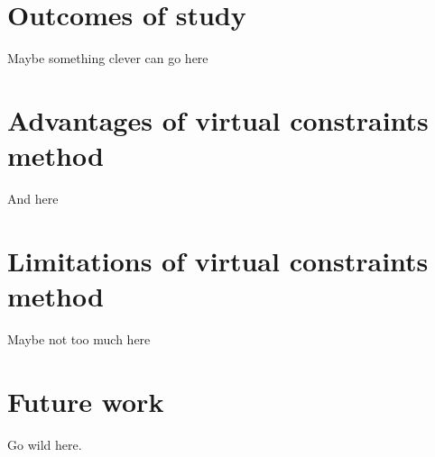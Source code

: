 \section{Outcomes of study}
Maybe something clever can go here

\section{Advantages of virtual constraints method}
And here

\section{Limitations of virtual constraints method}
Maybe not too much here

\section{Future work}
Go wild here.